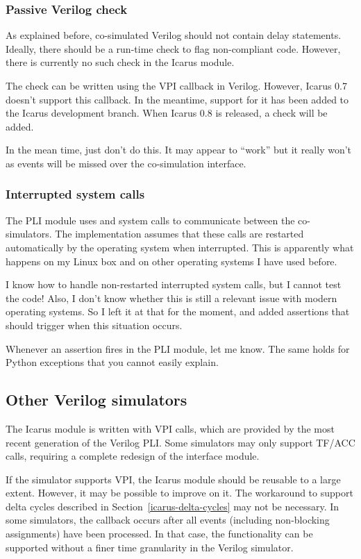 \subsubsection{Passive Verilog check}

As explained before, co-simulated Verilog should not contain delay
statements. Ideally, there should be a run-time check to flag
non-compliant code. However, there is currently no such check in the
Icarus module.

The check can be written using the  VPI callback
in Verilog. However, Icarus 0.7 doesn't support this callback. In the
meantime, support for it has been added to the Icarus development
branch.  When Icarus 0.8 is released, a check will be added.

In the mean time, just don't do this. It may appear to ``work'' but it
really won't as events will be missed over the co-simulation
interface.

\subsubsection{Interrupted system calls}

The PLI module uses  and  system calls to
communicate between the co-simulators. The implementation assumes that
these calls are restarted automatically by the operating system when
interrupted. This is apparently what happens on my Linux box and on
other operating systems I have used before.

I know how to handle non-restarted interrupted system calls, but I
cannot test the code! Also, I don't know whether this is still a
relevant issue with modern operating systems. So I left it
at that for the moment, and added assertions that should trigger
when this situation occurs.

Whenever an assertion fires in the PLI module, let me
know. The same holds for Python exceptions that you cannot
easily explain.

\subsection{Other Verilog simulators}

The Icarus module is written with VPI calls, which are provided by the
most recent generation of the Verilog PLI. Some simulators may only
support TF/ACC calls, requiring a complete redesign of the interface
module.

If the simulator supports VPI, the Icarus module should be reusable to
a large extent. However, it may be possible to improve on it.  The
workaround to support delta cycles described in
Section~\ref{icarus-delta-cycles} may not be necessary. In some
simulators, the  callback occurs after all
events (including non-blocking assignments) have been processed. In
that case, the functionality can be supported without a finer time
granularity in the Verilog simulator.

